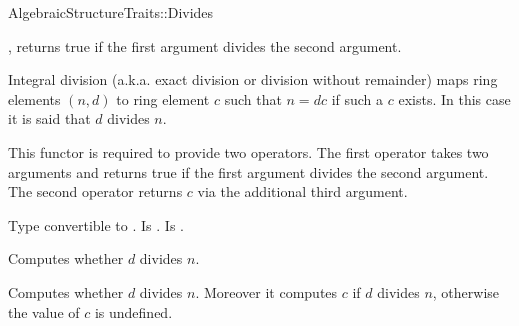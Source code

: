 \begin{ccRefFunctionObjectConcept}{AlgebraicStructureTraits::Divides}

\ccDefinition

, 
returns true if the first argument divides the second argument. 

Integral division (a.k.a. exact division or division without remainder) maps 
ring elements $(n,d)$ to ring element $c$ such that $n = dc$ if such a $c$ 
exists. In this case it is said that $d$ divides $n$. 

This functor is required to provide two operators. The first operator takes two
arguments and returns true if the first argument divides the second argument. 
The second operator returns $c$ via the additional third argument. 

\ccRefines 


\ccTypes
{} 
        { Type convertible to .}
\ccGlue
{} 
        { Is .}
\ccGlue
{} 
        { Is .}

\ccOperations
{}

        { Computes whether $d$ divides $n$. }

        { 
        Computes whether $d$ divides $n$.
        Moreover it computes $c$ if $d$ divides $n$, 
        otherwise the value of $c$ is undefined. 
        }


\ccSeeAlso

\\

\end{ccRefFunctionObjectConcept} 
